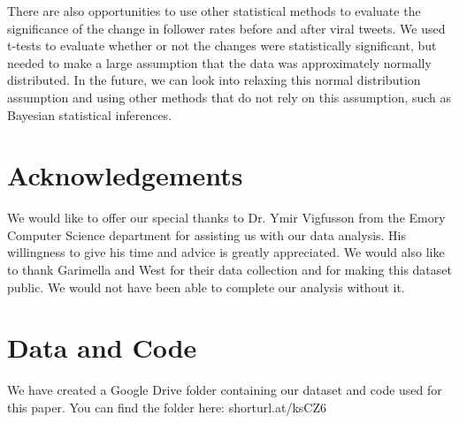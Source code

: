 \documentclass[twoside,twocolumn]{article}
\begin{document}
There are also opportunities to use other statistical methods to evaluate the significance of the change in follower rates before and after viral tweets. We used t-tests to evaluate whether or not the changes were statistically significant, but needed to make a large assumption that the data was approximately normally distributed. In the future, we can look into relaxing this normal distribution assumption and using other methods that do not rely on this assumption, such as Bayesian statistical inferences.

\section{Acknowledgements}
We would like to offer our special thanks to Dr. Ymir Vigfusson from the Emory Computer Science department for assisting us with our data analysis. His willingness to give his time and advice is greatly appreciated. We would also like to thank Garimella and West for their data collection and for making this dataset public. We would not have been able to complete our analysis without it. 

\section{Data and Code}
We have created a Google Drive folder containing our dataset and code used for this paper. You can find the folder here: shorturl.at/ksCZ6 \\
\pagebreak
%  
% 
\printbibliography

% 
% 





 
\end{document}
